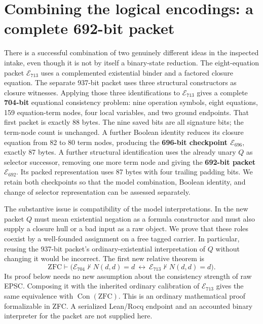 \section{Combining the logical encodings: a complete 692-bit packet}
\label{sec:eq704}

There is a successful combination of two genuinely different ideas in the
inspected intake, even though it is not by itself a binary-state reduction.
The eight-equation packet $\mathcal E_{713}$ uses a complemented existential
binder and a factored closure equation.  The separate 937-bit packet uses
three structural constructors as closure witnesses.  Applying those three
identifications to $\mathcal E_{713}$ gives a complete \textbf{704-bit}
equational consistency problem: nine operation symbols, eight equations,
159 equation-term nodes, four local variables, and two ground endpoints.
That first packet is exactly 88 bytes.  The nine saved bits are all
signature bits; the term-node count is unchanged.  A further Boolean
identity reduces its closure equation from 82 to 80 term nodes, producing
the \textbf{696-bit checkpoint $\mathcal E_{696}$}, exactly 87 bytes.
A further structural identification uses the already unary $Q$ as
selector successor, removing one more term node and giving the
\textbf{692-bit packet $\mathcal E_{692}$}.  Its packed representation
uses 87 bytes with four trailing padding bits.  We retain both checkpoints
so that the model combination, Boolean identity, and change of selector
representation can be assessed separately.

The substantive issue is compatibility of the model interpretations.
In the new packet $Q$ must mean existential negation as a formula
constructor and must also supply a closure hull or a bad input as a raw
object.  We prove that these roles coexist by a well-founded assignment
on a free tagged carrier.  In particular, reusing the 937-bit packet's
ordinary-existential interpretation of $Q$ without changing it would be
incorrect.  The first new relative theorem is
\begin{equation}
 \mathrm{ZFC}\vdash
 \bigl(\mathcal E_{704}\nvdash N(d,d)=d
       \ \longleftrightarrow\
       \mathcal E_{713}\nvdash N(d,d)=d\bigr).
 \label{eq:704-relative}
\end{equation}
Its proof below needs no new assumption about the consistency strength
of raw EPSC.  Composing it with the inherited ordinary calibration of
$\mathcal E_{713}$ gives the same equivalence with
$\operatorname{Con}(\mathrm{ZFC})$.  This is an ordinary mathematical
proof formalizable in ZFC.  A serialized Lean/Rocq endpoint and an
accounted binary interpreter for the packet are not supplied here.

